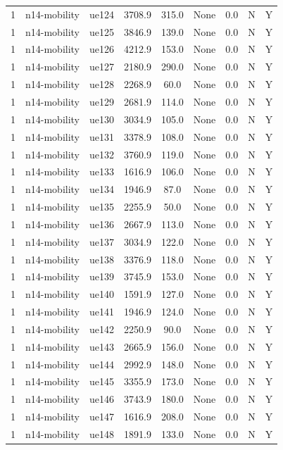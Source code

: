 \begin{table}[ht]
\begin{tabular}{|c|c|c|c|c|c|c|c|c|}
1 & n14-mobility & ue124 & 3708.9 & 315.0 & None & 0.0 & N & Y \\
1 & n14-mobility & ue125 & 3846.9 & 139.0 & None & 0.0 & N & Y \\
1 & n14-mobility & ue126 & 4212.9 & 153.0 & None & 0.0 & N & Y \\
1 & n14-mobility & ue127 & 2180.9 & 290.0 & None & 0.0 & N & Y \\
1 & n14-mobility & ue128 & 2268.9 & 60.0 & None & 0.0 & N & Y \\
1 & n14-mobility & ue129 & 2681.9 & 114.0 & None & 0.0 & N & Y \\
1 & n14-mobility & ue130 & 3034.9 & 105.0 & None & 0.0 & N & Y \\
1 & n14-mobility & ue131 & 3378.9 & 108.0 & None & 0.0 & N & Y \\
1 & n14-mobility & ue132 & 3760.9 & 119.0 & None & 0.0 & N & Y \\
1 & n14-mobility & ue133 & 1616.9 & 106.0 & None & 0.0 & N & Y \\
1 & n14-mobility & ue134 & 1946.9 & 87.0 & None & 0.0 & N & Y \\
1 & n14-mobility & ue135 & 2255.9 & 50.0 & None & 0.0 & N & Y \\
1 & n14-mobility & ue136 & 2667.9 & 113.0 & None & 0.0 & N & Y \\
1 & n14-mobility & ue137 & 3034.9 & 122.0 & None & 0.0 & N & Y \\
1 & n14-mobility & ue138 & 3376.9 & 118.0 & None & 0.0 & N & Y \\
1 & n14-mobility & ue139 & 3745.9 & 153.0 & None & 0.0 & N & Y \\
1 & n14-mobility & ue140 & 1591.9 & 127.0 & None & 0.0 & N & Y \\
1 & n14-mobility & ue141 & 1946.9 & 124.0 & None & 0.0 & N & Y \\
1 & n14-mobility & ue142 & 2250.9 & 90.0 & None & 0.0 & N & Y \\
1 & n14-mobility & ue143 & 2665.9 & 156.0 & None & 0.0 & N & Y \\
1 & n14-mobility & ue144 & 2992.9 & 148.0 & None & 0.0 & N & Y \\
1 & n14-mobility & ue145 & 3355.9 & 173.0 & None & 0.0 & N & Y \\
1 & n14-mobility & ue146 & 3743.9 & 180.0 & None & 0.0 & N & Y \\
1 & n14-mobility & ue147 & 1616.9 & 208.0 & None & 0.0 & N & Y \\
1 & n14-mobility & ue148 & 1891.9 & 133.0 & None & 0.0 & N & Y \\

\end{tabular}
\end{table}
